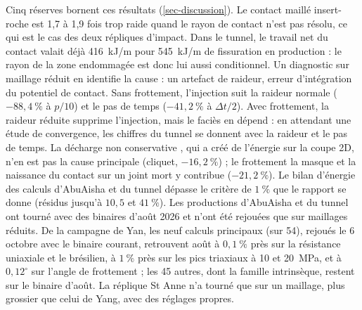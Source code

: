 Cinq réserves bornent ces résultats (\cref{sec-discussion}). Le contact maillé insert-roche est 1,7 à 1,9 fois trop raide quand le rayon de contact n'est pas résolu, ce qui est le cas des deux répliques d'impact. Dans le tunnel, le travail net du contact valait déjà 416~kJ/m pour 545~kJ/m de fissuration en production : le rayon de la zone endommagée est donc lui aussi conditionnel. Un diagnostic sur maillage réduit en identifie la cause : un artefact de raideur, erreur d'intégration du potentiel de contact. Sans frottement, l'injection suit la raideur normale ($-88{,}4~\%$ à $p/10$) et le pas de temps ($-41{,}2~\%$ à $\Delta t/2$). Avec frottement, la raideur réduite supprime l'injection, mais le faciès en dépend : en attendant une étude de convergence, les chiffres du tunnel se donnent avec la raideur et le pas de temps. La décharge non conservative , qui a créé de l'énergie sur la coupe 2D, n'en est pas la cause principale (cliquet, $-16{,}2~\%$) ; le frottement la masque et la naissance du contact sur un joint mort y contribue ($-21{,}2~\%$). Le bilan d'énergie des calculs d'AbuAisha et du tunnel dépasse le critère de $1~\%$ que le rapport se donne (résidus jusqu'à $10{,}5$ et $41~\%$). Les productions d'AbuAisha et du tunnel ont tourné avec des binaires d'août 2026 et n'ont été rejouées que sur maillages réduits. De la campagne de Yan, les neuf calculs principaux (sur 54), rejoués le 6 octobre avec le binaire courant, retrouvent août à $0{,}1~\%$ près sur la résistance uniaxiale et le brésilien, à $1~\%$ près sur les pics triaxiaux à 10 et 20~MPa, et à $0{,}12^\circ$ sur l'angle de frottement ; les 45 autres, dont la famille intrinsèque, restent sur le binaire d'août. La réplique St Anne n'a tourné que sur un maillage, plus grossier que celui de Yang, avec des réglages propres.
\clearpage
